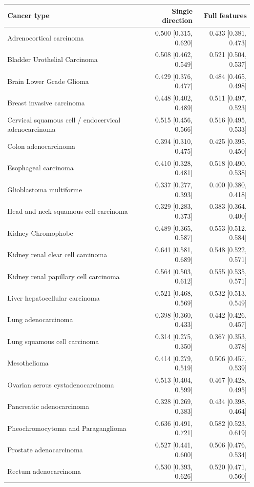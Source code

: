 \begin{tabularx}{\textwidth}{@{}Yrr@{}}
\toprule
Cancer type & Single direction & Full features \\
\midrule
Adrenocortical carcinoma & 0.500 [0.315, 0.620] & 0.433 [0.381, 0.473] \\
Bladder Urothelial Carcinoma & 0.508 [0.462, 0.549] & 0.521 [0.504, 0.537] \\
Brain Lower Grade Glioma & 0.429 [0.376, 0.477] & 0.484 [0.465, 0.498] \\
Breast invasive carcinoma & 0.448 [0.402, 0.489] & 0.511 [0.497, 0.523] \\
Cervical squamous cell / endocervical adenocarcinoma & 0.515 [0.456, 0.566] & 0.516 [0.495, 0.533] \\
Colon adenocarcinoma & 0.394 [0.310, 0.475] & 0.425 [0.395, 0.450] \\
Esophageal carcinoma & 0.410 [0.328, 0.481] & 0.518 [0.490, 0.538] \\
Glioblastoma multiforme & 0.337 [0.277, 0.393] & 0.400 [0.380, 0.418] \\
Head and neck squamous cell carcinoma & 0.329 [0.283, 0.373] & 0.383 [0.364, 0.400] \\
Kidney Chromophobe & 0.489 [0.365, 0.587] & 0.553 [0.512, 0.584] \\
Kidney renal clear cell carcinoma & 0.641 [0.581, 0.689] & 0.548 [0.522, 0.571] \\
Kidney renal papillary cell carcinoma & 0.564 [0.503, 0.612] & 0.555 [0.535, 0.571] \\
Liver hepatocellular carcinoma & 0.521 [0.468, 0.569] & 0.532 [0.513, 0.549] \\
Lung adenocarcinoma & 0.398 [0.360, 0.433] & 0.442 [0.426, 0.457] \\
Lung squamous cell carcinoma & 0.314 [0.275, 0.350] & 0.367 [0.353, 0.378] \\
Mesothelioma & 0.414 [0.279, 0.519] & 0.506 [0.457, 0.539] \\
Ovarian serous cystadenocarcinoma & 0.513 [0.404, 0.599] & 0.467 [0.428, 0.495] \\
Pancreatic adenocarcinoma & 0.328 [0.269, 0.383] & 0.434 [0.398, 0.464] \\
Pheochromocytoma and Paraganglioma & 0.636 [0.491, 0.721] & 0.582 [0.523, 0.619] \\
Prostate adenocarcinoma & 0.527 [0.441, 0.600] & 0.506 [0.476, 0.534] \\
Rectum adenocarcinoma & 0.530 [0.393, 0.626] & 0.520 [0.471, 0.560] \\

\end{tabularx}
